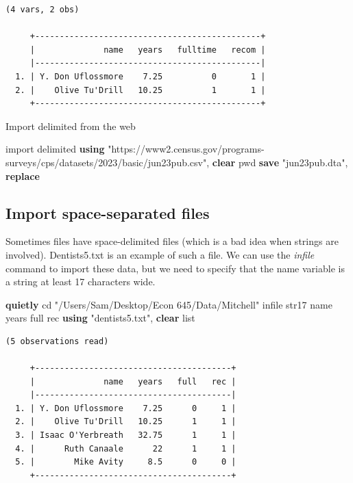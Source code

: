 \documentclass[
]{book}
\newenvironment{Shaded}{\begin{snugshade}}{\end{snugshade}}
\newcommand{\BaseNTok}[1]{\textcolor[rgb]{0.00,0.00,0.81}{#1}}
\newcommand{\KeywordTok}[1]{\textcolor[rgb]{0.13,0.29,0.53}{\textbf{#1}}}
\newcommand{\NormalTok}[1]{#1}
\newcommand{\OtherTok}[1]{\textcolor[rgb]{0.56,0.35,0.01}{#1}}
\newcommand{\StringTok}[1]{\textcolor[rgb]{0.31,0.60,0.02}{#1}}
\begin{document}
\begin{verbatim}
(4 vars, 2 obs)

     +----------------------------------------------+
     |              name   years   fulltime   recom |
     |----------------------------------------------|
  1. | Y. Don Uflossmore    7.25          0       1 |
  2. |    Olive Tu'Drill   10.25          1       1 |
     +----------------------------------------------+
\end{verbatim}

Import delimited from the web

\begin{Shaded}
\begin{Highlighting}[]
\NormalTok{import delimited }\KeywordTok{using} \StringTok{"https://www2.census.gov/programs{-}surveys/cps/datasets/2023/basic/jun23pub.csv"}\NormalTok{, }\KeywordTok{clear}
\NormalTok{pwd}
\KeywordTok{save} \StringTok{"jun23pub.dta"}\NormalTok{, }\KeywordTok{replace}
\end{Highlighting}
\end{Shaded}

\subsection{Import space-separated files}\label{import-space-separated-files}

Sometimes files have space-delimited files (which is a bad idea when strings are involved). Dentists5.txt is an example of such a file. We can use the \emph{infile} command to import these data, but we need to specify that the name variable is a string at least 17 characters wide.

\begin{Shaded}
\begin{Highlighting}[]
\KeywordTok{quietly}\NormalTok{ cd }\StringTok{"/Users/Sam/Desktop/Econ 645/Data/Mitchell"}
\NormalTok{infile str17 }\BaseNTok{name}\NormalTok{ years full rec }\KeywordTok{using} \StringTok{"dentists5.txt"}\NormalTok{, }\KeywordTok{clear}
\OtherTok{list}
\end{Highlighting}
\end{Shaded}

\begin{verbatim}
(5 observations read)

     +----------------------------------------+
     |              name   years   full   rec |
     |----------------------------------------|
  1. | Y. Don Uflossmore    7.25      0     1 |
  2. |    Olive Tu'Drill   10.25      1     1 |
  3. | Isaac O'Yerbreath   32.75      1     1 |
  4. |      Ruth Canaale      22      1     1 |
  5. |        Mike Avity     8.5      0     0 |
     +----------------------------------------+
\end{verbatim}
\end{document}
